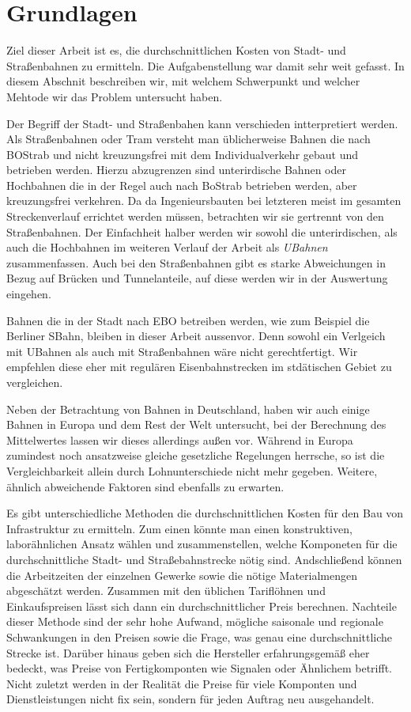 \section{Grundlagen}

Ziel dieser Arbeit ist es, die durchschnittlichen Kosten von Stadt- und
Straßenbahnen zu ermitteln. Die Aufgabenstellung war damit sehr weit gefasst. In
diesem Abschnit beschreiben wir, mit welchem Schwerpunkt und welcher Mehtode wir
das Problem untersucht haben.

Der Begriff der Stadt- und Straßenbahen kann verschieden intterpretiert
werden. Als Straßenbahnen oder Tram versteht man üblicherweise Bahnen die nach
BOStrab \cite{bostrab} und nicht kreuzungsfrei mit dem Individualverkehr gebaut
und betrieben werden. Hierzu abzugrenzen sind unterirdische Bahnen oder
Hochbahnen die in der Regel auch nach BoStrab betrieben werden, aber
kreuzungsfrei verkehren. Da da Ingenieursbauten bei letzteren meist im gesamten
Streckenverlauf errichtet werden müssen, betrachten wir sie gertrennt von den
Straßenbahnen. Der Einfachheit halber werden wir sowohl die unterirdischen, als
auch die Hochbahnen im weiteren Verlauf der Arbeit als \emph{UBahnen}
zusammenfassen. Auch bei den Straßenbahnen gibt es starke Abweichungen in Bezug
auf Brücken und Tunnelanteile, auf diese werden wir in der Auswertung eingehen.

Bahnen die in der Stadt nach EBO \cite{ebo} betreiben werden, wie zum Beispiel
die Berliner SBahn, bleiben in dieser Arbeit aussenvor. Denn sowohl ein
Verlgeich mit UBahnen als auch mit Straßenbahnen wäre nicht gerechtfertigt. Wir
empfehlen diese eher mit regulären Eisenbahnstrecken im stdätischen Gebiet zu
vergleichen.

Neben der Betrachtung von Bahnen in Deutschland, haben wir auch einige Bahnen in
Europa und dem Rest der Welt untersucht, bei der Berechnung des Mittelwertes
lassen wir dieses allerdings außen vor. Während in Europa zumindest noch
ansatzweise gleiche gesetzliche Regelungen herrsche, so ist die
Vergleichbarkeit allein durch Lohnunterschiede nicht mehr gegeben. Weitere,
ähnlich abweichende Faktoren sind ebenfalls zu erwarten.

Es gibt unterschiedliche Methoden die durchschnittlichen Kosten für den Bau von
Infrastruktur zu ermitteln. Zum einen könnte man einen konstruktiven,
laborähnlichen Ansatz wählen und zusammenstellen, welche Komponeten für die
durchschnittliche Stadt- und Straßebahnstrecke nötig sind. Andschließend können
die Arbeitzeiten der einzelnen Gewerke sowie die nötige Materialmengen
abgeschätzt werden. Zusammen mit den üblichen Tariflöhnen und Einkaufspreisen
lässt sich dann ein durchschnittlicher Preis berechnen. Nachteile dieser Methode
sind der sehr hohe Aufwand, mögliche saisonale und regionale Schwankungen in den
Preisen sowie die Frage, was genau eine durchschnittliche Strecke ist. Darüber
hinaus geben sich die Hersteller erfahrungsgemäß eher bedeckt, was Preise von
Fertigkomponten wie Signalen oder Ähnlichem betrifft. Nicht zuletzt werden in
der Realität die Preise für viele Komponten und Dienstleistungen nicht fix sein,
sondern für jeden Auftrag neu ausgehandelt.

